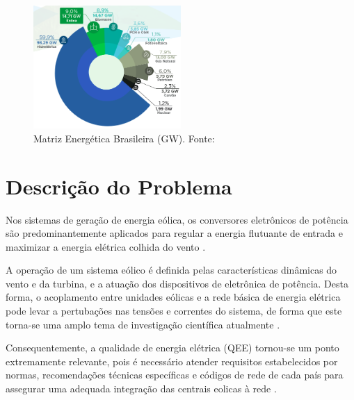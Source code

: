 
\begin{figure}[!hbt]
	\begin{center}
    \includegraphics[width=0.5\textwidth]{figuras/matriz_eletrica_brasileira.png}
    \caption{Matriz Energética Brasileira (GW). Fonte: \cite{ABEeolica}}
    \label{fig:matriz-energetica-brasileira}
    \end{center}
\end{figure}

\section{Descrição do Problema}


Nos sistemas de geração de energia eólica, os conversores eletrônicos de potência são predominantemente aplicados para regular a energia flutuante de entrada e maximizar a energia elétrica colhida do vento \cite{Ellabban2014}.

A operação de um sistema eólico é definida pelas características dinâmicas do vento e da turbina, e a atuação dos dispositivos de eletrônica de potência.
Desta forma, o acoplamento entre unidades eólicas e a rede básica de energia elétrica pode levar a pertubações nas tensões e correntes do sistema, de forma que este torna-se uma amplo tema de investigação científica atualmente \cite{TeseProfAlex}.

Consequentemente, a qualidade de energia elétrica (QEE) tornou-se um ponto extremamente relevante, pois é necessário atender requisitos estabelecidos por normas, recomendações técnicas específicas e códigos de rede de cada país para assegurar uma adequada integração das centrais eolicas à rede \cite{DissertacaoJoao}.

